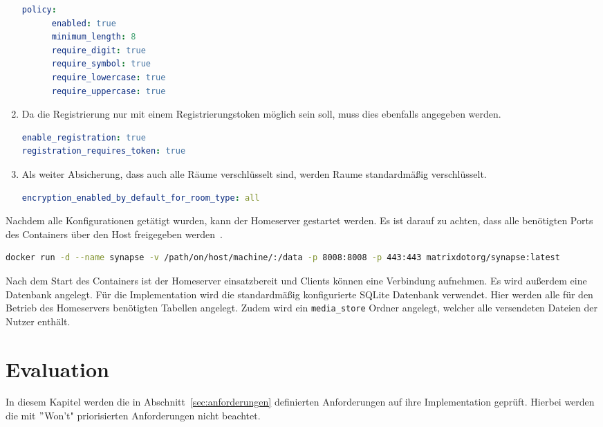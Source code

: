 \begin{enumerate}[label={(\arabic*)}]
\begin{lstlisting}[language=yaml,label={lst:password-policy}]
   policy:
      enabled: true
      minimum_length: 8
      require_digit: true
      require_symbol: true
      require_lowercase: true
      require_uppercase: true
            \end{lstlisting}
        \item Da die Registrierung nur mit einem Registrierungstoken möglich sein soll, muss dies ebenfalls angegeben werden.
        \begin{lstlisting}[language=yaml,label={lst:enable-registration}]
enable_registration: true
registration_requires_token: true
        \end{lstlisting}
        \item Als weiter Absicherung, dass auch alle Räume verschlüsselt sind, werden Raume standardmäßig verschlüsselt.
    \begin{lstlisting}[language=yaml,label={lst:enable-encryption}]
encryption_enabled_by_default_for_room_type: all
    \end{lstlisting}
    \end{enumerate}

    Nachdem alle Konfigurationen getätigt wurden, kann der Homeserver gestartet werden.
    Es ist darauf zu achten, dass alle benötigten Ports des Containers über den Host freigegeben werden~\cite{synapse}.

    \begin{lstlisting}[language=bash,label={lst:synapse-start}]
docker run -d --name synapse -v /path/on/host/machine/:/data -p 8008:8008 -p 443:443 matrixdotorg/synapse:latest
    \end{lstlisting}

    Nach dem Start des Containers ist der Homeserver einsatzbereit und Clients können eine Verbindung aufnehmen.
    Es wird außerdem eine Datenbank angelegt.
    Für die Implementation wird die standardmäßig konfigurierte SQLite Datenbank verwendet.
    Hier werden alle für den Betrieb des Homeservers benötigten Tabellen angelegt.
    Zudem wird ein \texttt{media\_store} Ordner angelegt, welcher alle versendeten Dateien der Nutzer enthält.

    \newpage
    \chapter{Evaluation}\label{ch:evaluation}
    In diesem Kapitel werden die in Abschnitt~\ref{sec:anforderungen} definierten Anforderungen auf ihre Implementation geprüft.
    Hierbei werden die mit \("\)Won't" priorisierten Anforderungen nicht beachtet.

